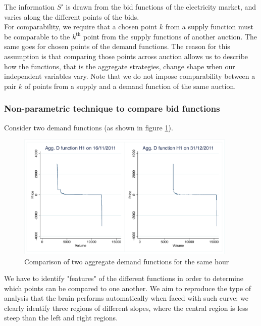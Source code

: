 The information $S'$ is drawn from the bid functions of the electricity 
market, and varies along the different points of the bids.\\

For comparability, we require that a chosen point $k$ from a supply function must be comparable to the $k^\text{th}$ point from the supply functions of another auction. The same goes for chosen points of the demand functions. The reason for this assumption is that comparing those points across auction allows us to describe how the functions, that is the aggregate strategies, change shape when our independent variables vary. Note that we do not impose comparability between a pair $k$ of points from a supply and a demand function of the same auction. 

 
\subsubsection{Non-parametric technique to compare bid functions}
\label{comparablepoints}
Consider two demand functions (as shown in figure \ref{comparedfunc}). 
\begin{figure}[!ht]
\centering
\includegraphics[trim=0.1cm 0.1cm 0.1cm 0.1cm, clip=true, height= 60mm]{figch2/compare2d.pdf}
\caption{Comparison of two aggregate demand functions for the same hour}
\label{comparedfunc}
\end{figure}
 We have to identify "features" of the different functions in order to determine which points can be compared to one another. We aim to reproduce the type of analysis that the brain performs automatically when faced with such curve: we clearly identify three regions of different slopes, where the central region is less steep than the left and right regions. \\

